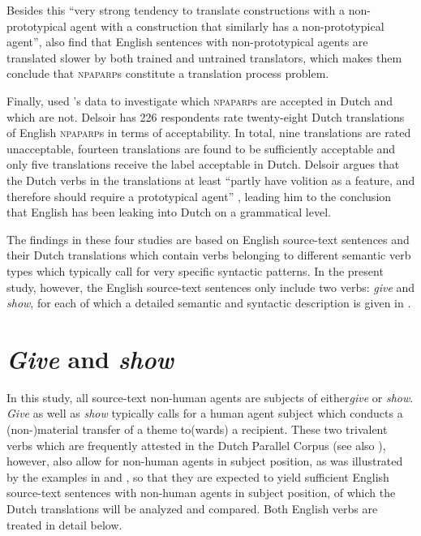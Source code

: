 \documentclass[output=paper]{LSP/langsci}
\begin{document}
Besides this “very strong tendency to translate constructions with a non-prototypical agent with a construction that similarly has a non-prototypical agent”, \citet[11]{Vandepitte2011} also find that English sentences with non-prototypical agents are translated slower by both trained and untrained translators, which makes them conclude that \textsc{npaparp}s constitute a translation process problem. 

Finally, \citet{Delsoir2011} used \citeauthor{Vandepitte2011}'s \citeyear{Vandepitte2011} data to investigate which \textsc{npaparp}s are accepted in Dutch and which are not. Delsoir has 226 respondents rate twenty-eight Dutch translations of English \textsc{npaparp}s in terms of acceptability. In total, nine translations are rated unacceptable, fourteen translations are found to be sufficiently acceptable and only five translations receive the label acceptable in Dutch. Delsoir argues that the Dutch verbs in the translations at least “partly have volition as a feature, and therefore should require a prototypical agent” \citet[34]{Vandepitte2011}, leading him to the conclusion that English has been leaking into Dutch on a grammatical level. 

The findings in these four studies are based on English source-text sentences and their Dutch translations which contain verbs belonging to different semantic verb types which typically call for very specific syntactic patterns. In the present study, however, the English source-text sentences only include two verbs: \textit{give} and \textit{show}, for each of which a detailed semantic and syntactic description is given in .  

\section{\textit{Give} and \textit{show}} \label{sec:5:4}

In this study, all source-text non-human agents are subjects of either\textit{give} or \textit{show}. \textit{Give} as well as \textit{show} typically calls for a human agent subject which conducts a (non-)material transfer of a theme to(wards) a recipient. These two trivalent verbs which are frequently attested in the Dutch Parallel Corpus (see also ), however, also allow for non-human agents in subject position, as was illustrated by the examples in  and , so that they are expected to yield sufficient English source-text sentences with non-human agents in subject position, of which the Dutch translations will be analyzed and compared. Both English verbs are treated in detail below.  
  
\end{document}
